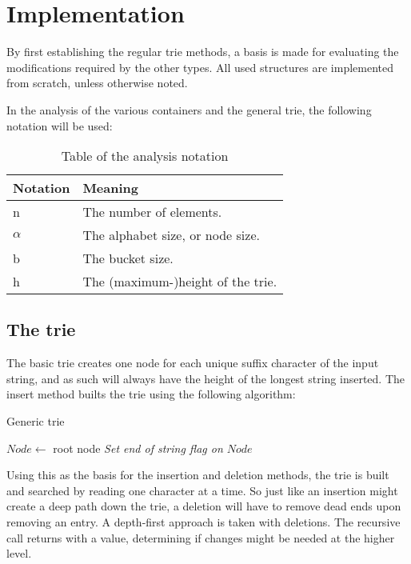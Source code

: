 \chapter{Implementation}
By first establishing the regular trie methods, a basis is made for evaluating
the modifications required by the other types. All used structures are
implemented from scratch, unless otherwise noted.

In the analysis of the various containers and the general trie, the following
notation will be used:
\begin{table}[h!]
    \centering
    \begin{tabular}[here]{ l l}
        Notation & Meaning \\ \hline
        n       & The number of elements.\\
        $\alpha$& The alphabet size, or node size.\\
        b       & The bucket size.\\
        h       & The (maximum-)height of the trie. \\
    \end{tabular}
    \caption{Table of the analysis notation}
    \label{tab:notation}
\end{table}

\section{The trie}
The basic trie creates one node for each unique suffix character of the input string,
and as such will always have the height of the longest string inserted.
The {\keyword insert} method builts the trie using the following algorithm:

\begin{algorithm}[H]
    \caption{Generic trie }
    \label{alg:gt_insert}

    $Node \leftarrow$  root node\;
    \emph{Set end of string flag on $Node$}\;
\end{algorithm}

Using this as the basis for the insertion and deletion methods, the trie is
built and searched by reading one character at a time. So just like an
insertion might create a deep path down the trie, a deletion will have to
remove dead ends upon removing an entry. A depth-first approach is taken
with deletions. The recursive call returns with a value, determining if
changes might be needed at the higher level.

